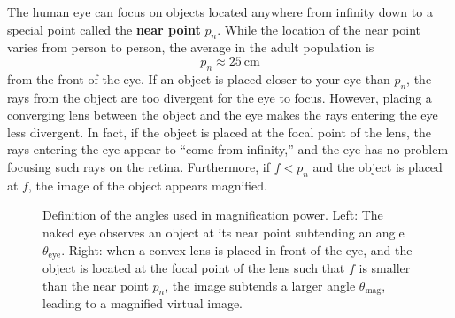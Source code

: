 \documentclass[addpoints]{physlabs}
\begin{document}
\begin{labsection}
\begin{theory}
    The human eye can focus on objects located anywhere from infinity down to a special point called the \textbf{near point} $p_n$. While the location of the near point varies from person to person, the average in the adult population is
    \[
        \overline{p}_n\approx\qty{25}{\centi\meter}
    \]
    from the front of the eye. If an object is placed closer to your eye than $p_n$, the rays from the object are too divergent for the eye to focus. However, placing a converging lens between the object and the eye makes the rays entering the eye less divergent. In fact, if the object is placed at the focal point of the lens, the rays entering the eye appear to ``come from infinity,'' and the eye has no problem focusing such rays on the retina. Furthermore, if $f<p_n$ and the object is placed at $f$, the image of the object appears magnified.

    \begin{figure}[ht]
        \centering
        
        \caption{Definition of the angles used in magnification power. Left: The naked eye observes an object at its near point subtending an angle $\theta_\text{eye}$. Right: when a convex lens is placed in front of the eye, and the object is located at the focal point of the lens such that $f$ is smaller than the near point $p_n$, the image subtends a larger angle $\theta_\text{mag}$, leading to a magnified virtual image.}
        \label{fig: magnification power}
    \end{figure}


\end{theory}
\end{labsection}
\end{document}
